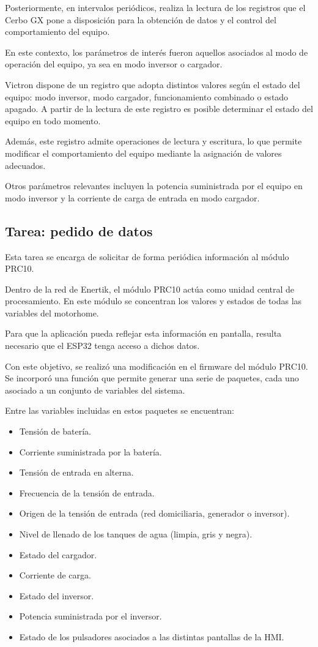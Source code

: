 Posteriormente, en intervalos periódicos, realiza la lectura de los
registros que el Cerbo GX pone a disposición para la obtención de datos
y el control del comportamiento del equipo.

En este contexto, los parámetros de interés fueron aquellos asociados
al modo de operación del equipo, ya sea en modo inversor o cargador.

Victron dispone de un registro que adopta distintos valores según el
estado del equipo: modo inversor, modo cargador, funcionamiento
combinado o estado apagado. A partir de la lectura de este registro es
posible determinar el estado del equipo en todo momento.

Además, este registro admite operaciones de lectura y escritura, lo que
permite modificar el comportamiento del equipo mediante la asignación
de valores adecuados.

Otros parámetros relevantes incluyen la potencia suministrada por el
equipo en modo inversor y la corriente de carga de entrada en modo
cargador.

\subsection{Tarea: pedido de datos}
\label{sec:pedido_datos}
Esta tarea se encarga de solicitar de forma periódica información al
módulo PRC10.

Dentro de la red de Enertik, el módulo PRC10 actúa como unidad central de
procesamiento. En este módulo se concentran los valores y estados de
todas las variables del motorhome.

Para que la aplicación pueda reflejar esta información en pantalla,
resulta necesario que el ESP32 tenga acceso a dichos datos.

Con este objetivo, se realizó una modificación en el firmware del módulo PRC10. Se incorporó una función que permite generar
una serie de paquetes, cada uno asociado a un conjunto de variables del
sistema.

Entre las variables incluidas en estos paquetes se encuentran:

\begin{itemize}
    \item Tensión de batería.
    \item Corriente suministrada por la batería.   
    \item Tensión de entrada en alterna.
    \item Frecuencia de la tensión de entrada.
    \item Origen de la tensión de entrada (red domiciliaria, generador o inversor).
    \item Nivel de llenado de los tanques de agua (limpia, gris y negra).
    \item Estado del cargador.
    \item Corriente de carga.
    \item Estado del inversor.
    \item Potencia suministrada por el inversor.
    \item Estado de los pulsadores asociados a las distintas pantallas de la HMI.
\end{itemize}

